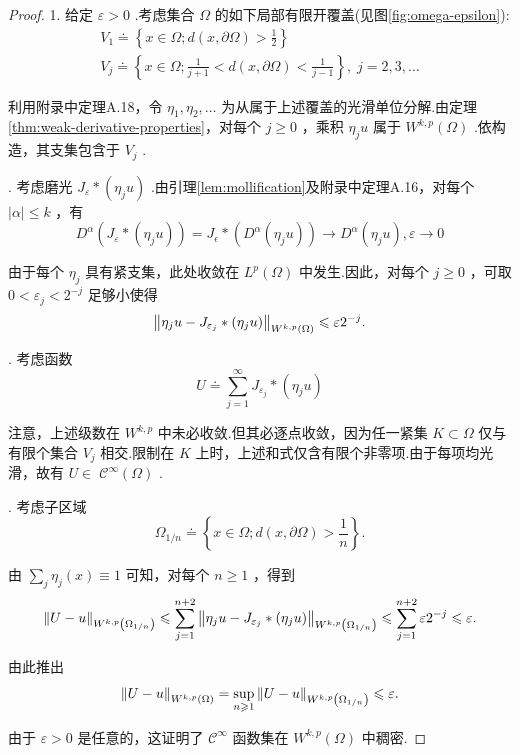 \begin{proof}
1. 给定 $\varepsilon  > 0$ .考虑集合 $\Omega$ 的如下局部有限开覆盖(见图\ref{fig:omega-epsilon}):
\begin{gather*}
{V}_{1} \doteq  \left\{  {x \in  \Omega ;d\left( {x,\partial \Omega }\right)  > \frac{1}{2}}\right\}\\
{V}_{j} \doteq  \left\{  {x \in  \Omega ;\frac{1}{j + 1} < d\left( {x,\partial \Omega }\right)  < \frac{1}{j - 1}}\right\}  ,\;j = 2,3,\ldots
\end{gather*}

利用附录中定理A.18，令 ${\eta }_{1},{\eta }_{2},\ldots$ 为从属于上述覆盖的光滑单位分解.由定理\ref{thm:weak-derivative-properties}，对每个 $j \geq  0$ ，乘积 ${\eta }_{j}u$ 属于 ${W}^{k,p}\left( \Omega \right)$ .依构造，其支集包含于 ${V}_{j}$ .

. 考虑磨光 ${J}_{\varepsilon } * \left( {{\eta }_{j}u}\right)$ .由引理\ref{lem:mollification}及附录中定理A.16，对每个 $\left| \alpha \right|  \leq  k$ ，有
\[
{D}^{\alpha }\left( {{J}_{\varepsilon } * \left( {{\eta }_{j}u}\right) }\right)  = {J}_{\epsilon } * \left( {{D}^{\alpha }\left( {{\eta }_{j}u}\right) }\right)  \rightarrow  {D}^{\alpha }\left( {{\eta }_{j}u}\right),\varepsilon\to 0
\]

由于每个 ${\eta }_{j}$ 具有紧支集，此处收敛在 ${L}^{p}\left( \Omega \right)$ 中发生.因此，对每个 $j \geq  0$ ，可取 $0 < {\varepsilon }_{j} < {2}^{-j}$ 足够小使得
\[
{\norm{\eta _{j}u - {J}_{{\varepsilon }_{j}} * \left( {\eta }_{j}u\right) }}_{{W}^{k,p}\left( \Omega \right) } \leqslant  \varepsilon {2}^{-j}.
\]

. 考虑函数
\[
U \doteq  \sum_{{j = 1}}^{\infty }{J}_{{\varepsilon }_{j}} * \left( {{\eta }_{j}u}\right)
\]

注意，上述级数在 ${W}^{k,p}$ 中未必收敛.但其必逐点收敛，因为任一紧集 $K \subset  \Omega$ 仅与有限个集合 ${V}_{j}$ 相交.限制在 $K$ 上时，上述和式仅含有限个非零项.由于每项均光滑，故有 $U \in \; {\mathcal{C}}^{\infty }\left( \Omega \right)$ .

. 考虑子区域
\[
{\Omega }_{1/n} \doteq  \left\{  {x \in  \Omega ;d\left( {x,\partial \Omega }\right)  > \frac{1}{n}}\right\}  .
\]

由 $\sum_{j}{\eta }_{j}\left( x\right)  \equiv  1$ 可知，对每个 $n \geq  1$ ，得到
\[
\| U - u{\| }_{{W}^{k,p}\left( {\Omega }_{1/n}\right) } \leqslant  \sum_{{j = 1}}^{{n + 2}}{\norm{\eta _{j}u - {J}_{{\varepsilon }_{j}} * \left( {\eta }_{j}u\right) }}_{{W}^{k,p}\left( {\Omega }_{1/n}\right) } \leqslant  \sum_{{j = 1}}^{{n + 2}}\varepsilon {2}^{-j} \leqslant  \varepsilon .
\]

由此推出
\[
\norm{U - u}_{{W}^{k,p}\left( \Omega \right) } = \mathop{\sup }\limits_{{n \geqslant  1}}\norm{U - u}_{{W}^{k,p}\left( {\Omega }_{1/n}\right) } \leqslant  \varepsilon .
\]

由于 $\varepsilon  > 0$ 是任意的，这证明了 ${\mathcal{C}}^{\infty }$ 函数集在 ${W}^{k,p}\left( \Omega \right)$ 中稠密.
\end{proof}

